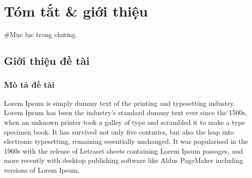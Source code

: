 \chapter{Tóm tắt \& giới thiệu}
\minitoc #Mục lục trong chương.
\newpage
\section{Giới thiệu đề tài}
\subsection{Mô tả đề tài}
Lorem Ipsum is simply dummy text of the printing and typesetting industry. Lorem Ipsum has been the industry's standard dummy text ever since the 1500s, when an unknown printer took a galley of type and scrambled it to make a type specimen book. It has survived not only five centuries, but also the leap into electronic typesetting, remaining essentially unchanged. It was popularised in the 1960s with the release of Letraset sheets containing Lorem Ipsum passages, and more recently with desktop publishing software like Aldus PageMaker including versions of Lorem Ipsum.
